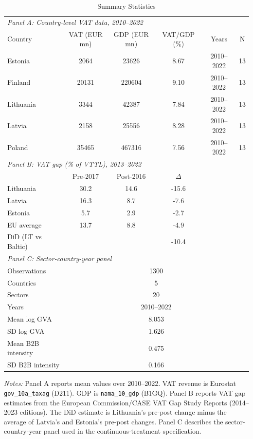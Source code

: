 \begin{table}[t]
\centering
\caption{Summary Statistics}
\label{tab:sumstats}
\small
\begin{tabular}{lccccc}
\hline\hline
\multicolumn{6}{l}{\textit{Panel A: Country-level VAT data, 2010--2022}} \\[3pt]
Country & VAT (EUR mn) & GDP (EUR mn) & VAT/GDP (\%) & Years & N \\
\hline
Estonia & 2064 & 23626 & 8.67 & 2010--2022 & 13 \\
Finland & 20131 & 220604 & 9.10 & 2010--2022 & 13 \\
Lithuania & 3344 & 42387 & 7.84 & 2010--2022 & 13 \\
Latvia & 2158 & 25556 & 8.28 & 2010--2022 & 13 \\
Poland & 35465 & 467316 & 7.56 & 2010--2022 & 13 \\
\hline
\multicolumn{6}{l}{\textit{Panel B: VAT gap (\% of VTTL), 2013--2022}} \\[3pt]
 & Pre-2017 & Post-2016 & $\Delta$ & & \\
\hline
Lithuania & 30.2 & 14.6 & -15.6 & & \\
Latvia & 16.3 & 8.7 & -7.6 & & \\
Estonia & 5.7 & 2.9 & -2.7 & & \\
EU average & 13.7 & 8.8 & -4.9 & & \\
DiD (LT vs Baltic) & & & -10.4 & & \\
\hline
\multicolumn{6}{l}{\textit{Panel C: Sector-country-year panel}} \\[3pt]
Observations & \multicolumn{5}{c}{1300} \\
Countries & \multicolumn{5}{c}{5} \\
Sectors & \multicolumn{5}{c}{20} \\
Years & \multicolumn{5}{c}{2010--2022} \\
Mean log GVA & \multicolumn{5}{c}{8.053} \\
SD log GVA & \multicolumn{5}{c}{1.626} \\
Mean B2B intensity & \multicolumn{5}{c}{0.475} \\
SD B2B intensity & \multicolumn{5}{c}{0.166} \\
\hline\hline
\end{tabular}
\begin{tablenotes}
\item \textit{Notes:} Panel A reports mean values over 2010--2022. VAT revenue is Eurostat \texttt{gov\_10a\_taxag} (D211). GDP is \texttt{nama\_10\_gdp} (B1GQ). Panel B reports VAT gap estimates from the European Commission/CASE VAT Gap Study Reports (2014--2023 editions). The DiD estimate is Lithuania's pre-post change minus the average of Latvia's and Estonia's pre-post changes. Panel C describes the sector-country-year panel used in the continuous-treatment specification.
\end{tablenotes}
\end{table}
